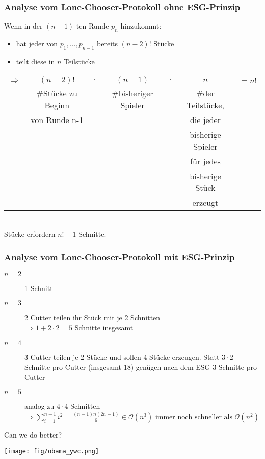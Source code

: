 \documentclass[a4paper,10pt]{scrartcl}
\begin{document}
\subsubsection{Analyse vom Lone-Chooser-Protokoll ohne ESG-Prinzip}
Wenn in der $(n-1)$-ten Runde $p_n$ hinzukommt:
\begin{itemize}
 \item hat jeder von $p_1,\dots,p_{n-1}$ bereits $(n-2)!$ Stücke
 \item teilt diese in $n$ Teilstücke
\end{itemize}
 \begin{tabular}{ccccccc}$\Rightarrow$&$(n-2)!$&$\cdot$&$(n-1)$&$\cdot$&$n$&$=n!$\\
            &\#Stücke zu Beginn&&\#bisheriger Spieler&&\#der Teilstücke,&\\
              &von Runde n-1 &&&&die jeder&\\
              &&&&&bisherige Spieler&\\
              &&&&&für jedes&\\
              &&&&&bisherige Stück&\\
              &&&&&erzeugt&
               \end{tabular}\\
Stücke erfordern $n!-1$ Schnitte.
\subsubsection{Analyse vom Lone-Chooser-Protokoll mit ESG-Prinzip}
\begin{description}
 \item[$n=2$] 1 Schnitt
 \item[$n=3$] 2 Cutter teilen ihr Stück mit je 2 Schnitten\\$\Rightarrow 1+2\cdot2=5$ Schnitte insgesamt
 \item[$n=4$] 3 Cutter teilen je 2 Stücke und sollen 4 Stücke erzeugen. Statt $3\cdot2$ Schnitte pro Cutter (insgesamt 18) genügen nach
              dem ESG 3 Schnitte pro Cutter
 \item[$n=5$] analog zu $4\cdot4$ Schnitten\\$\Rightarrow\sum\limits_{i=1}^{n-1}i^2=\frac{(n-1)n(2n-1)}{6}\in \mathcal{O}(n^3)
              \text{ immer noch schneller als } \mathcal{O}(n^2)$
\end{description}
Can we do better?
\begin{center}
 \texttt{[image: fig/obama\_ywc.png]}
\end{center}
\end{document}
